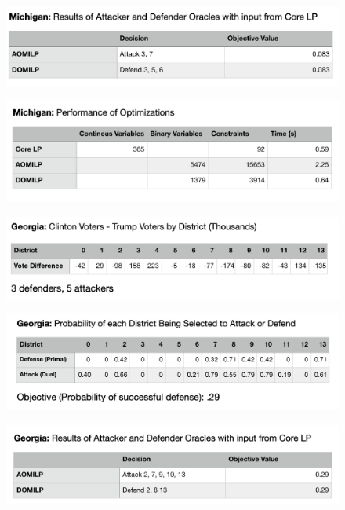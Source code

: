 \documentclass[letterpaper]{article} %
\begin{document}
\begin{figure}
    \includegraphics[width=\linewidth]{michigan_oracles}
    \label{michigan_oracles}
\end{figure}

\begin{figure}
    \includegraphics[width=\linewidth]{michigan_perfs}
    \label{michigan_perfs}
\end{figure}

\begin{figure}
    \includegraphics[width=\linewidth]{georgia_votes}
    \label{georgia_votes}
\end{figure}

\begin{figure}
    \includegraphics[width=\linewidth]{georgia_probs}
    \label{georgia_probs}
\end{figure}

\begin{figure}
    \includegraphics[width=\linewidth]{georgia_oracles}
    \label{georgia_oracles}
\end{figure}
\end{document}
